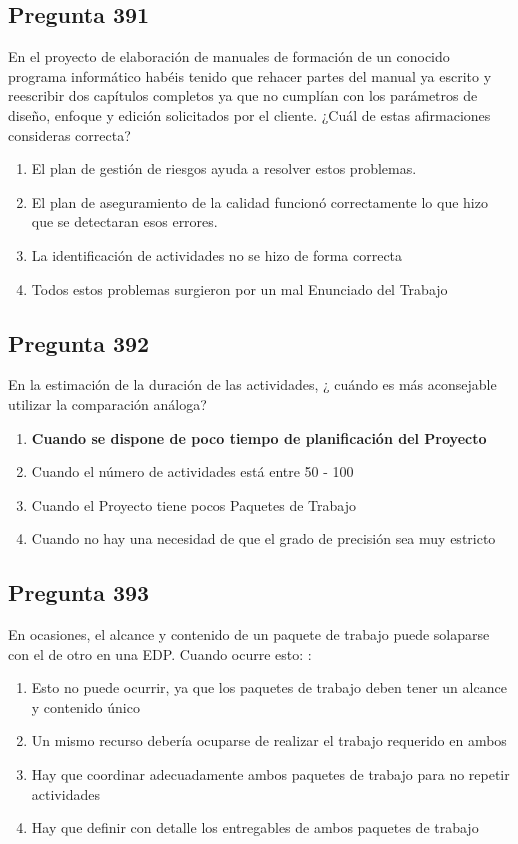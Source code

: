 \documentclass[11pt,a4paper]{article}
\begin{document}
\subsection*{Pregunta 391}
En el proyecto de elaboración de manuales de formación de un conocido programa informático habéis tenido que rehacer partes del manual ya escrito y reescribir dos capítulos completos ya que no cumplían con los parámetros de diseño, enfoque y edición solicitados por el cliente. ¿Cuál de estas afirmaciones consideras correcta?

\begin{enumerate}[label=\alph*)]
  \item El plan de gestión de riesgos ayuda a resolver estos problemas.
  \item El plan de aseguramiento de la calidad funcionó correctamente lo que hizo que se detectaran esos errores.
  \item La identificación de actividades no se hizo de forma correcta
  \item Todos estos problemas surgieron por un mal Enunciado del Trabajo
\end{enumerate}

\subsection*{Pregunta 392}
En la estimación de la duración de las actividades, ¿ cuándo es más aconsejable utilizar la comparación análoga?

\begin{enumerate}[label=\alph*)]
  \item \textbf{Cuando se dispone de poco tiempo de planificación del Proyecto}
  \item Cuando el número de actividades está entre 50 - 100
  \item Cuando el Proyecto tiene pocos Paquetes de Trabajo
  \item Cuando no hay una necesidad de que el grado de precisión sea muy estricto
\end{enumerate}

\subsection*{Pregunta 393}
En ocasiones, el alcance y contenido de un paquete de trabajo puede solaparse con el de otro en una EDP. Cuando ocurre esto: :

\begin{enumerate}[label=\alph*)]
  \item Esto no puede ocurrir, ya que los paquetes de trabajo deben tener un alcance y contenido único
  \item Un mismo recurso debería ocuparse de realizar el trabajo requerido en ambos
  \item Hay que coordinar adecuadamente ambos paquetes de trabajo para no repetir actividades
  \item Hay que definir con detalle los entregables de ambos paquetes de trabajo
\end{enumerate}
\end{document}
